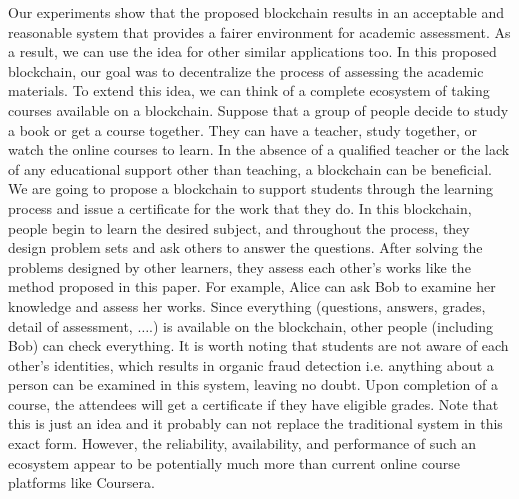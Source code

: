 \documentclass[manuscript,review,anonymous]{acmart}%
\begin{document}
 Our experiments show that the proposed blockchain results in an acceptable and reasonable system that provides a fairer environment for academic assessment.
 As a result, we can use the idea for other similar applications too. In this proposed blockchain, our goal was to decentralize the process of assessing the academic materials.
 To extend this idea, we can think of a complete ecosystem of taking courses available on a blockchain.
 Suppose that a group of people decide to study a book or get a course together. They can have a teacher, study together, or watch the online courses to learn.
 In the absence of a qualified teacher or the lack of any educational support other than teaching, a blockchain can be beneficial. 
 We are going to propose a blockchain to support students through the learning process and issue a certificate for the work that they do.
 In this blockchain, people begin to learn the desired subject, and throughout the process, they design problem sets and ask others to answer the questions.
 After solving the problems designed by other learners, they assess each other's works like the method proposed in this paper.
 For example, Alice can ask Bob to examine her knowledge and assess her works. 
 Since everything (questions, answers, grades, detail of assessment, $\dots$.) is available on the blockchain, other people (including Bob) can check everything.
 It is worth noting that students are not aware of each other's identities, which results in organic fraud detection i.e. anything about a person can be examined in this system, leaving no doubt.
 Upon completion of a course, the attendees will get a certificate if they have eligible grades. Note that this is just an idea and it probably can not replace the traditional system in this exact form.
 However, the reliability, availability, and performance of such an ecosystem appear to be potentially much more than current online course platforms like Coursera.



\end{document}
